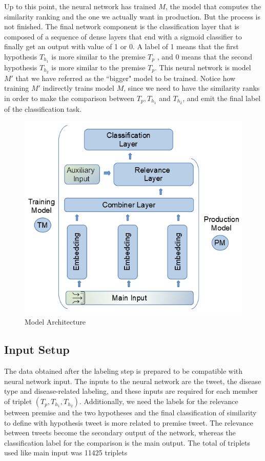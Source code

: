 \documentclass[12pt]{report}
\begin{document}
Up to this point, the neural network has trained $M$, the model that computes the similarity ranking and the one we
actually want in production. But  the process
is not finished.
The final network component is the classification layer that is composed of a sequence of dense layers that end with a sigmoid classifier to finally get an output with value of 1 or 0. A label of  1 means that the first hypothesis  $T_{h_1}$ is more similar to the premise $T_p$ , and 0 means that the second hypothesis
$T_{h_2}$ is more similar to the premise $T_p$. This neural network is model $M'$ that we have referred as the ``bigger" model to be trained. Notice how 
training $M'$ indirectly trains model $M$, since we need to have the similarity ranks in order to make the comparison between $T_p, T_{h_1}$ and $T_{h_2}$, and emit the final label of the classification task. 
\begin{figure}[htbp]	
	\centering
	\includegraphics[width=140mm, scale = 1]{images/11_all_model.png}	
	\caption{Model Architecture}	
	\label{figure:all_model}
\end{figure}


\subsection{Input Setup}
The data obtained after the labeling step is prepared to be compatible with neural network input. The inputs to the neural network are the tweet, the disease type and disease-related labeling, and these inputs are required for each member of triplet $(T_p, T_{h_1},T_{h_2})$. Additionally, we need the labels for the relevance between premise and the two hypotheses and the final classification of similarity to define with hypothesis tweet is more related to premise tweet. 
The relevance between tweets become the secondary output of the network, whereas the classification label for the comparison is the main output. The total of triplets used like main input was 11425 triplets
\end{document}
